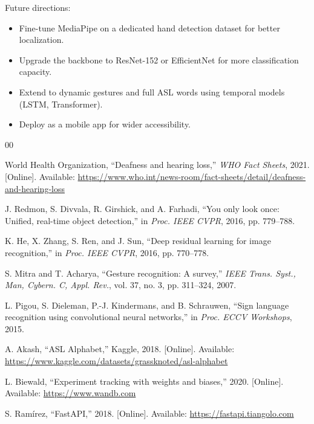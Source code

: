 \documentclass[conference]{IEEEtran}
\begin{document}
Future directions:
\begin{itemize}
    \item Fine-tune MediaPipe on a dedicated hand detection dataset for better localization.
    \item Upgrade the backbone to ResNet-152 or EfficientNet for more classification capacity.
    \item Extend to dynamic gestures and full ASL words using temporal models (LSTM, Transformer).
    \item Deploy as a mobile app for wider accessibility.
\end{itemize}
\begin{thebibliography}{00}

World Health Organization, ``Deafness and hearing loss,'' \textit{WHO Fact Sheets}, 2021. [Online]. Available: \url{https://www.who.int/news-room/fact-sheets/detail/deafness-and-hearing-loss}

J. Redmon, S. Divvala, R. Girshick, and A. Farhadi, ``You only look once: Unified, real-time object detection,'' in \textit{Proc. IEEE CVPR}, 2016, pp. 779--788.

K. He, X. Zhang, S. Ren, and J. Sun, ``Deep residual learning for image recognition,'' in \textit{Proc. IEEE CVPR}, 2016, pp. 770--778.

S. Mitra and T. Acharya, ``Gesture recognition: A survey,'' \textit{IEEE Trans. Syst., Man, Cybern. C, Appl. Rev.}, vol. 37, no. 3, pp. 311--324, 2007.

L. Pigou, S. Dieleman, P.-J. Kindermans, and B. Schrauwen, ``Sign language recognition using convolutional neural networks,'' in \textit{Proc. ECCV Workshops}, 2015.

A. Akash, ``ASL Alphabet,'' Kaggle, 2018. [Online]. Available: \url{https://www.kaggle.com/datasets/grassknoted/asl-alphabet}

L. Biewald, ``Experiment tracking with weights and biases,'' 2020. [Online]. Available: \url{https://www.wandb.com}

S. Ram\'irez, ``FastAPI,'' 2018. [Online]. Available: \url{https://fastapi.tiangolo.com}

\end{thebibliography}



\end{document}
